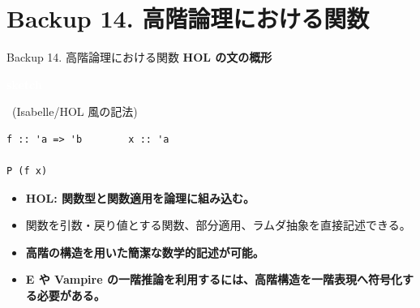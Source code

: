 \documentclass[dvipdfmx,aspectratio=169,11pt]{beamer}
\newcommand{\statusbadge}[2]{\colorbox{#1}{\textcolor{white}{\strut\scriptsize\sffamily\bfseries #2}}}
\newcommand{\badgeSketch}{\statusbadge{orange!75!black}{sketch}}
\begin{document}
\section{Backup 14. 高階論理における関数}
\begin{frame}[fragile,t]{Backup 14. 高階論理における関数}
\smallskip
\textbf{HOL の文の概形}~\badgeSketch~{\footnotesize(Isabelle/HOL 風の記法)}
\begin{lstlisting}[language={},basicstyle=\ttfamily\small]
f :: 'a => 'b        x :: 'a

P (f x)
\end{lstlisting}
\begin{itemize}
\setlength{\itemsep}{1pt}
\setlength{\parsep}{0pt}
\setlength{\parskip}{0pt}
\item \textcolor{blue!55!black}{\textbf{HOL: 関数型と関数適用を論理に組み込む。}}
\item 関数を引数・戻り値とする関数、部分適用、ラムダ抽象を直接記述できる。
\item \textcolor{blue!55!black}{\textbf{高階の構造を用いた簡潔な数学的記述が可能。}}
\item \textcolor{blue!55!black}{\textbf{E や Vampire の一階推論を利用するには、高階構造を一階表現へ符号化する必要がある。}}
\end{itemize}
\end{frame}
\end{document}
